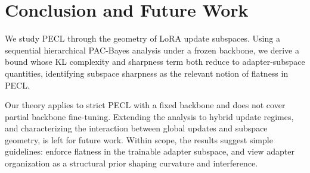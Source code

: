\documentclass{article}
\theoremstyle{plain}
\theoremstyle{definition}
\theoremstyle{remark}
\begin{document}






\section{Conclusion and Future Work}

We study PECL through the geometry of LoRA update subspaces. Using a sequential hierarchical PAC-Bayes analysis under a frozen backbone, we derive a bound whose KL complexity and sharpness term both reduce to adapter-subspace quantities, identifying subspace sharpness as the relevant notion of flatness in PECL. 



Our theory applies to strict PECL with a fixed backbone and does not cover partial backbone fine-tuning. Extending the analysis to hybrid update regimes, and characterizing the interaction between global updates and subspace geometry, is left for future work. Within scope, the results suggest simple guidelines: enforce flatness in the trainable adapter subspace, and view adapter organization as a structural prior shaping curvature and interference.


\end{document}
